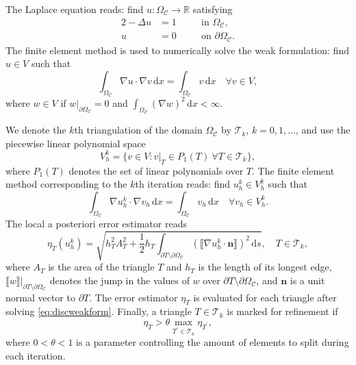 \documentclass[12pt]{article}
\begin{document}
The Laplace equation reads: find $u : \Omega_{\mathcal{C}} \rightarrow \mathbb{R}$ satisfying
\begin{alignat}{2}
-\Delta u &= 1 \quad && \text{in $\Omega_{\mathcal{C}}$,} \\
u &= 0 \quad && \text{on $\partial \Omega_{\mathcal{C}}$.}
\end{alignat}
The finite element method is used to numerically solve the
weak formulation: find \(u \in V\) such that
\begin{equation}
   \label{eq:weakform}
   \int_{\Omega_{\mathcal{C}}} \nabla u \cdot \nabla v \,\mathrm{d}x = \int_{\Omega_{\mathcal{C}}} v\,\mathrm{d}x \quad \forall v \in V,
\end{equation}
where
\(w \in V\) if \(w |_{\partial \Omega_{\mathcal{C}}} = 0\) and
$
   \int_{\Omega_{\mathcal{C}}} (\nabla w)^2 \,\mathrm{d}x < \infty.
$

We denote the \(k\)th triangulation of the
domain \(\Omega_{\mathcal{C}}\) by \(\mathcal{T}_k\), \(k=0,1,\dots\), and
use the piecewise linear polynomial space
$$V_h^k = \{ v \in V : v|_T \in P_1(T)~\forall T \in \mathcal{T}_k \},$$
where $P_1(T)$ denotes the set of linear polynomials over $T$.
The finite element method corresponding to the \(k\)th iteration reads:
find \(u_h^k \in V_h^k\) such that
\begin{equation}
   \label{eq:discweakform}
   \int_{\Omega_{\mathcal{C}}} \nabla u_h^k \cdot \nabla v_h \,\mathrm{d}x = \int_{\Omega_{\mathcal{C}}} v_h\,\mathrm{d}x \quad \forall v_h \in V_h^k.
\end{equation}
The local a posteriori error estimator
reads
\begin{equation}
        \eta_T(u_h^k) = \sqrt{h_T^2 A_T^2 + \frac12 h_T \int_{\partial T \setminus \partial \Omega_{\mathcal{C}}} (\llbracket \nabla u_h^k \cdot \boldsymbol{n} \rrbracket)^2 \,\mathrm{d}s}, \quad T \in \mathcal{T}_k,
\end{equation}
where $A_T$ is the area of the triangle $T$ and $h_T$ is the length of its longest edge, $\llbracket w \rrbracket |_{\partial T \setminus \partial \Omega_{\mathcal{C}}}$ denotes the jump in the values of
$w$ over $\partial T \setminus \partial \Omega_{\mathcal{C}}$, and $\boldsymbol{n}$ is a unit normal vector to
$\partial T$.
The error estimator $\eta_T$ is evaluated for each triangle
after solving \eqref{eq:discweakform}.
Finally, a triangle $T \in \mathcal{T}_k$ is marked for refinement if
\begin{equation}
  \label{eq:adaptivetheta}
   \eta_T > \theta \max_{T^\prime \in \mathcal{T}_k} \eta_{T^\prime},
\end{equation}
where $0 < \theta < 1$ is a parameter controlling the amount
of elements to split during each iteration.
\end{document}
